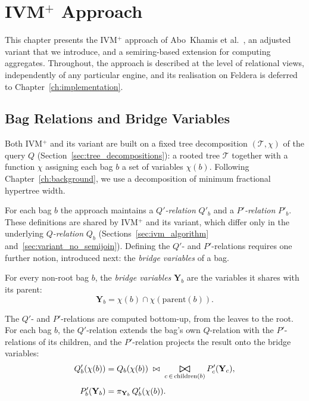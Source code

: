 \chapter{IVM$^+$ Approach}
\label{ch:ivm}

This chapter presents the IVM$^+$ approach of Abo~Khamis et al.~\cite{abokhamis2024Insert-Only}, an adjusted variant that we introduce, and a semiring-based extension for computing aggregates.
Throughout, the approach is described at the level of relational views, independently of any particular engine, and its realisation on Feldera is deferred to Chapter~\ref{ch:implementation}.

\section{Bag Relations and Bridge Variables}
\label{sec:bag_relations}

Both IVM$^+$ and its variant are built on a fixed tree decomposition $(\mathcal{T}, \chi)$ of the query $Q$ (Section~\ref{sec:tree_decompositions}): a rooted tree $\mathcal{T}$ together with a function $\chi$ assigning each bag $b$ a set of variables $\chi(b)$.
Following Chapter~\ref{ch:background}, we use a decomposition of minimum fractional hypertree width.

For each bag $b$ the approach maintains a \emph{$Q'$-relation} $Q'_b$ and a \emph{$P'$-relation} $P'_b$.
These definitions are shared by IVM$^+$ and its variant, which differ only in the underlying \emph{$Q$-relation} $Q_b$ (Sections~\ref{sec:ivm_algorithm} and~\ref{sec:variant_no_semijoin}).
Defining the $Q'$- and $P'$-relations requires one further notion, introduced next: the \emph{bridge variables} of a bag.

For every non-root bag $b$, the \emph{bridge variables} $\mathbf{Y}_b$ are the variables it shares with its parent:
\[
    \mathbf{Y}_b = \chi(b) \cap \chi(\mathrm{parent}(b)).
\]

\medskip

The $Q'$- and $P'$-relations are computed bottom-up, from the leaves to the root. For each bag $b$, the $Q'$-relation extends the bag's own $Q$-relation with the $P'$-relations of its children, and the $P'$-relation projects the result onto the bridge variables:
\begin{align}
    Q'_b(\chi(b)) &= Q_b(\chi(b)) \;\bowtie\; \bigbowtie_{c \,\in\, \mathrm{children}(b)} P'_c(\mathbf{Y}_c), \label{eq:qprime} \\[4pt]
    P'_b(\mathbf{Y}_b) &= \pi_{\mathbf{Y}_b}\, Q'_b(\chi(b)). \label{eq:pprime}
\end{align}

